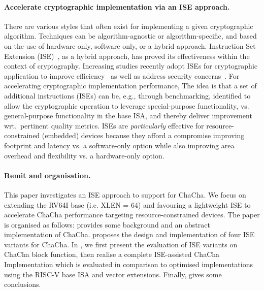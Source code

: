 \paragraph{Accelerate cryptographic implementation via an ISE approach.}
There are various styles that often exist for implementing a given cryptographic algorithm. 
Techniques can be algorithm-agnostic or algorithm-specific, and based on the use of hardware only, software only, or a hybrid approach. 
Instruction Set Extension (ISE)~\cite{GalBer:11,BarGioMar:09,RegIen:16}, as a hybrid approach, has proved its effectiveness within the context of cryptography. 
Increasing studies recently adopt ISEs for cryptographic application to improve efficiency~\cite{RCB:20,MNPSW:21} as well as address security concerns~\cite{GMPP:20}. 
For accelerating cryptographic implementation performance,
The idea is that a set of additional instructions (ISEs) can be, e.g., through benchmarking, identified 
to allow the cryptographic operation to leverage special-purpose functionality, 
vs. general-purpose functionality in the base ISA, and thereby deliver improvement wrt.\ pertinent quality metrics.
ISEs are {\em particularly} effective for resource-constrained (embedded) devices 
because they afford a compromise improving footprint and latency vs. a software-only option 
while also improving area overhead and flexibility vs. a hardware-only option.

\paragraph{Remit and organisation.}
This paper investigates an ISE approach to support for ChaCha. We focus on extending the RV64I base (i.e. XLEN = 64) and favouring a lightweight ISE to accelerate ChaCha performance targeting resource-constrained devices. The paper is organised as follows:
 provides some background and an abstract implementation of ChaCha.
 proposes the design and implementation of four ISE variants for ChaCha. 
In , we first present the evaluation of ISE variants on ChaCha block function, then realise a complete ISE-assisted ChaCha Implementation which is evaluated in comparison to optimised implementations using the RISC-V base ISA and vector extensions. 
Finally,  gives some conclusions.
